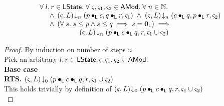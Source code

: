 %
%
\begin{lemma}[]\label{lem:amodMerge}
%
\[
\begin{array}{l}
	\forall\; l, r \in \textsf{LState}.\; \forall\; \varsigma_{}, \varsigma_{1}, \varsigma_{2} \in \textsf{AMod}.\; \forall\; n \in \mathbb{N}.\;\\
	\hspace*{0.5cm} \land\; \left(\varsigma_{}, L\right) \!\downarrow_{n} \left(p \bullet_{\textsf{L}} c, q \bullet_{\textsf{L}} r, \varsigma_{1}\right) \;\land\; \left(\varsigma_{}, L\right) \!\downarrow_{n} \left(c \bullet_{\textsf{L}} q, p \bullet_{\textsf{L}} r, \varsigma_{2}\right) \\
	\hspace*{0.5cm}\land\;\left( \forall\; s.\; s \leq p \land s \leq q \implies s = \mathbf{0}_{\textsf{L}} \right)
	\implies\\
	\hspace*{2cm} \left(\varsigma_{}, L\right) \!\downarrow_{n} \left(p \bullet_{\textsf{L}} c \bullet_{\textsf{L}} q, r, \varsigma_{1} \cup \varsigma_{2}\right)
\end{array}
\]
%
\begin{proof} By induction on number of steps $n$.\\
\noindent Pick an arbitrary $l, r \in \textsf{LState}, \varsigma_{}, \varsigma_{1}, \varsigma_{2} \in \textsf{AMod}$.\\
\noindent\textbf{Base case}\\
\textbf{RTS. }\hspace*{0.5cm}$\left(\varsigma_{}, L\right) \!\downarrow_{0} \left(p \bullet_{\textsf{L}} c \bullet_{\textsf{L}} q, r, \varsigma_{1} \cup \varsigma_{2}\right)$\\
This holds trivially by definition of $\left(\varsigma_{}, L\right) \!\downarrow_{0} \left(p \bullet_{\textsf{L}} c \bullet_{\textsf{L}} q, r, \varsigma_{1} \cup \varsigma_{2}\right)$\\


\end{proof}
\end{lemma}
